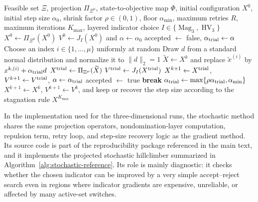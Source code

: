 \documentclass{article}
\newcommand{\Mag}{\operatorname{Mag}}
\newcommand{\HV}{\operatorname{HV}}
\begin{document}
\begin{algorithm}[htbp]
\caption{Projected stochastic hillclimbing reference optimizer}
\label{alg:stochastic-reference}
\begin{algorithmic}[1]
\Require Feasible set $\Xi$, projection $\Pi_{\Xi^\mu}$, state-to-objective map $\Phi$, initial configuration $X^0$, initial step size $\alpha_0$, shrink factor $\rho\in(0,1)$, floor $\alpha_{\min}$, maximum retries $R$, maximum iterations $K_{\max}$, layered indicator choice $I\in\{\Mag_3,\HV_3\}$
\State $X^0\gets \Pi_{\Xi^\mu}(X^0)$
\State $V^0\gets J_I(X^0)$ and $\alpha\gets \alpha_0$
    \State accepted $\gets$ false, $\alpha_{\rm trial}\gets\alpha$
        \State Choose an index $i\in\{1,\ldots,\mu\}$ uniformly at random
        \State Draw $d$ from a standard normal distribution and normalize it to $\|d\|_2=1$
        \State $\widetilde X\gets X^k$ and replace $\widetilde x^{(i)}$ by $x^{k,(i)}+\alpha_{\rm trial}d$
        \State $X^{\rm trial}\gets \Pi_{\Xi^\mu}(\widetilde X)$
        \State $V^{\rm trial}\gets J_I(X^{\rm trial})$
            \State $X^{k+1}\gets X^{\rm trial}$, $V^{k+1}\gets V^{\rm trial}$, $\alpha\gets\alpha_{\rm trial}$
            \State accepted $\gets$ true
            \State \textbf{break}
        \Else
            \State $\alpha_{\rm trial}\gets\max\{\rho\alpha_{\rm trial},\alpha_{\min}\}$
        \EndIf
    \EndFor
        \State $X^{k+1}\gets X^k$, $V^{k+1}\gets V^k$, and keep or recover the step size according to the stagnation rule
    \EndIf
\EndFor
\State \Return $X^{K_{\max}}$
\end{algorithmic}
\end{algorithm}

In the implementation used for the three-dimensional runs, the stochastic method shares the same projection operators, nondomination-layer computation, repulsion term, retry loop, and step-size recovery logic as the gradient method.  Its source code is part of the reproducibility package referenced in the main text, and it implements the projected stochastic hillclimber summarized in Algorithm~\ref{alg:stochastic-reference}.  Its role is mainly diagnostic: it checks whether the chosen indicator can be improved by a very simple accept--reject search even in regions where indicator gradients are expensive, unreliable, or affected by many active-set switches.
\end{document}
